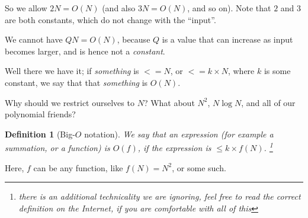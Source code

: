 \documentclass{article}
\newtheorem{definition}{Definition}
\begin{document}
So we allow $2N = O(N)$ (and also $3N = O(N)$, and so on).
Note that $2$ and $3$ are both constants, which do not change with the ``input''.

We cannot have $QN = O(N)$, because $Q$ is a value that can increase as input becomes larger,
and is hence not a \emph{constant}.

\vspace{1em}

Well there we have it; if \emph{something} is
$<= N$, or $<= k\times N$, where $k$ is some constant, we
say that that \emph{something} is $O(N)$.

Why should we restrict ourselves to $N$?
What about $N^2$, $N\log N$, and all of our polynomial friends?

\begin{definition}[Big-$O$ notation]
	We say that an expression (for example a summation, or a function)
	is $O(f)$, if the expression is $\leq k\times f(N)$.
	\footnote{there is an additional technicality we are ignoring, feel free
	to read the correct definition on the Internet, if you are comfortable with
	all of this}
\end{definition}

Here, $f$ can be any function, like $f(N) = N^2$, or some such.
\end{document}
